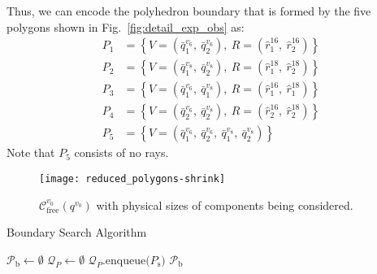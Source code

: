 \documentclass[journal]{IEEEtran}
\begin{document}
Thus, we can encode the polyhedron boundary that is formed by the five
polygons shown in Fig.~\ref{fig:detail_exp_obs} as:
\begin{align*}
    P_1&=\left\{V=\left(\bar{q}^{v_6}_{1},\ \bar{q}^{v_6}_{2}\right),\ R=\left(\hat{r}^{16}_{1},\ \hat{r}^{16}_{2}\right)\right\}\\
    P_2&=\left\{V=\left(\bar{q}^{v_8}_{1},\ \bar{q}^{v_8}_{2}\right),\ R=\left(\hat{r}^{18}_{1},\ \hat{r}^{18}_{2}\right)\right\}\\
    P_3&=\left\{V=\left(\bar{q}^{v_6}_{1},\ \bar{q}^{v_8}_{1}\right),\ R=\left(\hat{r}^{16}_{1},\ \hat{r}^{18}_{1}\right)\right\}\\
    P_4&=\left\{V=\left(\bar{q}^{v_6}_{2},\ \bar{q}^{v_8}_{2}\right),\ R=\left(\hat{r}^{16}_{2},\ \hat{r}^{18}_{2}\right)\right\}\\
    P_5&=\left\{V=\left(\bar{q}^{v_6}_{1},\ \bar{q}^{v_6}_{2},\ \bar{q}^{v_8}_{1},\ \bar{q}^{v_8}_{2}\right)\right\}
\end{align*}
Note that $P_5$ consists of no rays.

\begin{figure}[b!]
  \centering
  \texttt{[image: reduced\_polygons-shrink]}
  \caption{$\mathcal{C}_{\mathrm{free}}^{v_0}(q^{v_0})$ with physical
    sizes of components being considered.}
  \label{fig:bounded-c-free-shrink}
\end{figure}

\begin{algorithm}[t]
  \caption{Boundary Search Algorithm}\label{alg:bsa}
  $\mathcal{P}_{\mathrm{b}}\leftarrow\emptyset$\;
  $\mathcal{Q}_{P}\leftarrow\emptyset$\;
  $\mathcal{Q}_{P}\text{.enqueue(}P_{\mathrm{s}}\text{)}$\;
   \Return $\mathcal{P}_{\mathrm{b}}$
\end{algorithm}
\end{document}
